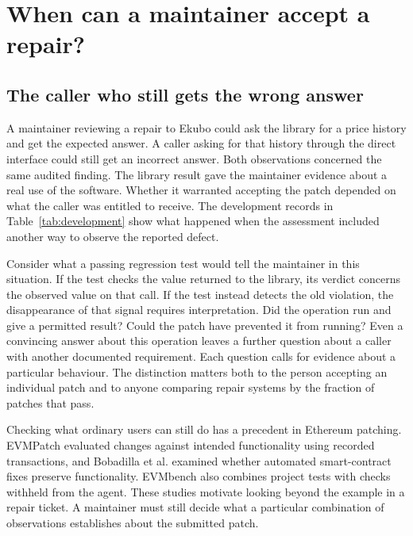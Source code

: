 \section{When can a maintainer accept a repair?}

\label{sec:introduction}

\subsection{The caller who still gets the wrong answer}

A maintainer reviewing a repair to Ekubo could ask the library for a price history and get the expected answer. A caller asking for that history through the direct interface could still get an incorrect answer. Both observations concerned the same audited finding. The library result gave the maintainer evidence about a real use of the software. Whether it warranted accepting the patch depended on what the caller was entitled to receive. The development records in Table~\ref{tab:development} show what happened when the assessment included another way to observe the reported defect.

Consider what a passing regression test would tell the maintainer in this situation. If the test checks the value returned to the library, its verdict concerns the observed value on that call. If the test instead detects the old violation, the disappearance of that signal requires interpretation. Did the operation run and give a permitted result? Could the patch have prevented it from running? Even a convincing answer about this operation leaves a further question about a caller with another documented requirement. Each question calls for evidence about a particular behaviour. The distinction matters both to the person accepting an individual patch and to anyone comparing repair systems by the fraction of patches that pass.

Checking what ordinary users can still do has a precedent in Ethereum patching. EVMPatch evaluated changes against intended functionality using recorded transactions, and Bobadilla et al. examined whether automated smart-contract fixes preserve functionality. EVMbench also combines project tests with checks withheld from the agent. These studies motivate looking beyond the example in a repair ticket. A maintainer must still decide what a particular combination of observations establishes about the submitted patch.~\cite{rodler2021evmpatch,bobadilla2026fixes,wang2026evmbench}

